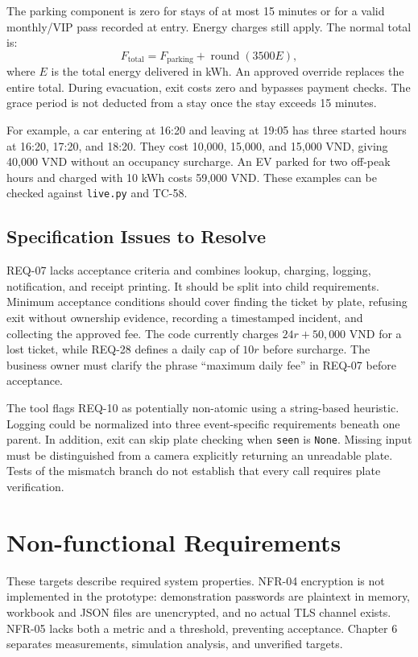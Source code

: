 The parking component is zero for stays of at most 15 minutes or for a valid monthly/VIP pass recorded at entry. Energy charges still apply. The normal total is:
\begin{equation}
F_{\mathrm{total}}=F_{\mathrm{parking}}+\operatorname{round}(3500E),
\end{equation}
where $E$ is the total energy delivered in kWh. An approved override replaces the entire total. During evacuation, exit costs zero and bypasses payment checks. The grace period is not deducted from a stay once the stay exceeds 15 minutes.

For example, a car entering at 16:20 and leaving at 19:05 has three started hours at 16:20, 17:20, and 18:20. They cost 10,000, 15,000, and 15,000 VND, giving 40,000 VND without an occupancy surcharge. An EV parked for two off-peak hours and charged with 10 kWh costs 59,000 VND. These examples can be checked against \texttt{live.py} and TC-58.

\subsection{Specification Issues to Resolve}
REQ-07 lacks acceptance criteria and combines lookup, charging, logging, notification, and receipt printing. It should be split into child requirements. Minimum acceptance conditions should cover finding the ticket by plate, refusing exit without ownership evidence, recording a timestamped incident, and collecting the approved fee. The code currently charges $24r+50{,}000$ VND for a lost ticket, while REQ-28 defines a daily cap of $10r$ before surcharge. The business owner must clarify the phrase ``maximum daily fee'' in REQ-07 before acceptance.

The tool flags REQ-10 as potentially non-atomic using a string-based heuristic. Logging could be normalized into three event-specific requirements beneath one parent. In addition, exit can skip plate checking when \texttt{seen} is \texttt{None}. Missing input must be distinguished from a camera explicitly returning an unreadable plate. Tests of the mismatch branch do not establish that every call requires plate verification.

\section{Non-functional Requirements}

These targets describe required system properties. NFR-04 encryption is not implemented in the prototype: demonstration passwords are plaintext in memory, workbook and JSON files are unencrypted, and no actual TLS channel exists. NFR-05 lacks both a metric and a threshold, preventing acceptance. Chapter 6 separates measurements, simulation analysis, and unverified targets.

